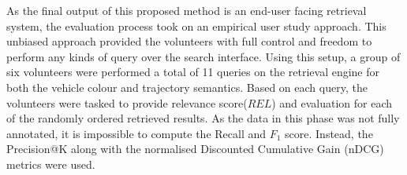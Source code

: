 As the final output of this proposed method is an end-user facing retrieval system, the evaluation process took on an empirical user study approach. This unbiased approach provided the volunteers with full control and freedom to perform any kinds of query over the search interface.
Using this setup, a group of six volunteers were performed a total of 11 queries on the retrieval engine for both the vehicle colour and trajectory semantics.
Based on each query, the volunteers were tasked to provide relevance score($REL$) and evaluation for each of the randomly ordered retrieved results.
As the data in this phase was not fully annotated, it is impossible to compute the Recall and $F_1$ score. Instead, the Precision@K along with the normalised Discounted Cumulative Gain (nDCG) metrics were used.

